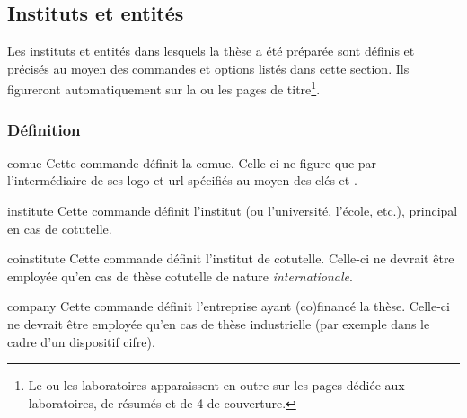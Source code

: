 \subsection{Instituts et entités}\label{sec-entites}

Les instituts et entités dans lesquels  la thèse
a été préparée sont définis et précisés au moyen des commandes et options
listés dans cette section. Ils figureront automatiquement sur la ou les pages
de titre\footnote{Le ou les laboratoires apparaissent en outre sur les pages
  dédiée aux laboratoires, de résumés et de 4\ieme{} de couverture.}.

\subsubsection{Définition}
%
\begin{docCommand}{comue}{}
  Cette commande définit la \gls{comue}. Celle-ci ne figure que par
  l'intermédiaire de ses logo et \acrshort{url} spécifiés au moyen des clés
   et .
\end{docCommand}
%
\begin{docCommand}[doc description=\mandatory]{institute}{}
  Cette commande définit l'institut (ou l'université, l'école, etc.), principal
  en cas de cotutelle.
\end{docCommand}
%
\begin{docCommand}{coinstitute}{}
  Cette commande définit l'institut de cotutelle. Celle-ci ne
  devrait être employée qu'en cas de thèse cotutelle de nature
  \emph{internationale}.
\end{docCommand}
%
\begin{docCommand}{company}{}
  Cette commande définit l'entreprise ayant (co)financé la thèse.
  Celle-ci ne devrait être employée qu'en cas de thèse industrielle (par
  exemple dans le cadre d'un dispositif \acrshort{cifre}).
\end{docCommand}
